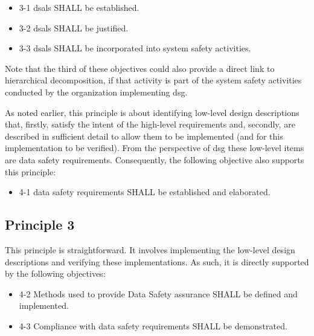 \begin{itemize}
	\item \textcolor{dsiwgAccentColour}{3-1} \Glspl{dsal} SHALL be established.
	\item \textcolor{dsiwgAccentColour}{3-2} \Glspl{dsal} SHALL be justified.
	\item \textcolor{dsiwgAccentColour}{3-3} \Glspl{dsal} SHALL be incorporated into system safety activities.
\end{itemize}

Note that the third of these objectives could also provide a direct link to hierarchical decomposition, if that activity is part of the system safety activities conducted by the organization implementing \gls{dsg}.

As noted earlier, this principle is about identifying low-level design descriptions that, firstly, satisfy the intent of the high-level requirements and, secondly, are described in sufficient detail to allow them to be implemented (and for this implementation to be verified). From the perspective of \gls{dsg} these low-level items are \glspl{data safety requirement}. Consequently, the following objective also supports this principle:

\begin{itemize}
	\item \textcolor{dsiwgAccentColour}{4-1} \Glspl{data safety requirement} SHALL be established and elaborated.
\end{itemize}


\subsection{Principle 3}

This principle is straightforward. It involves implementing the low-level design descriptions and verifying these implementations. As such, it is directly supported by the following objectives:

\begin{itemize}
	\item \textcolor{dsiwgAccentColour}{4-2} Methods used to provide Data Safety assurance SHALL be defined and implemented.
	\item \textcolor{dsiwgAccentColour}{4-3} Compliance with \glspl{data safety requirement} SHALL be demonstrated.	
\end{itemize}


